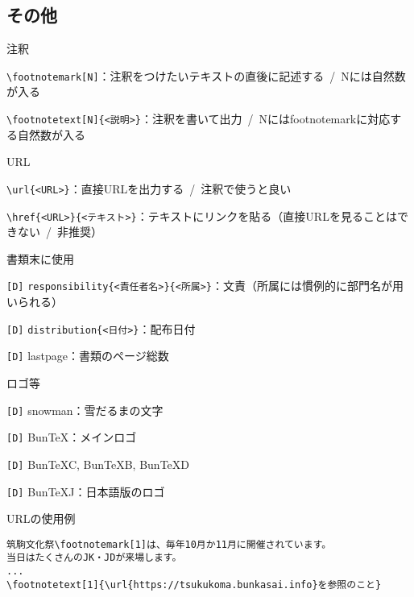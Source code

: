 \begin{multicols*}{2}
\section{その他}
\begin{framebox-simple}{注釈}
    \begin{reitemize}
        \item \verb|\footnotemark[N]|：注釈をつけたいテキストの直後に記述する~/~Nには自然数が入る
        \item \verb|\footnotetext[N]{<説明>}|：注釈を書いて出力~/~Nにはfootnotemarkに対応する自然数が入る
    \end{reitemize}
\end{framebox-simple}
\begin{framebox-simple}{URL}
    \begin{reitemize}
        \item \verb|\url{<URL>}|：直接URLを出力する~/~注釈で使うと良い
        \item \verb|\href{<URL>}{<テキスト>}|：テキストにリンクを貼る（直接URLを見ることはできない~/~非推奨）
    \end{reitemize}
\end{framebox-simple}
\begin{framebox-simple}{書類末に使用}
    \begin{reitemize}
        \item \verb|[D]| \verb|responsibility{<責任者名>}{<所属>}|：文責（所属には慣例的に部門名が用いられる）
        \item \verb|[D]| \verb|distribution{<日付>}|：配布日付
        \item \verb|[D]| lastpage：書類のページ総数
    \end{reitemize}
\end{framebox-simple}
\begin{framebox-simple}{ロゴ等}
    \begin{reitemize}
        \item \verb|[D]| snowman：雪だるまの文字
        \item \verb|[D]| BunTeX：メインロゴ
        \item \verb|[D]| BunTeXC, BunTeXB, BunTeXD
        \item \verb|[D]| BunTeXJ：日本語版のロゴ
    \end{reitemize}
\end{framebox-simple}
\begin{framebox-ref}{URLの使用例}
\begin{verbatim}
筑駒文化祭\footnotemark[1]は、毎年10月か11月に開催されています。
当日はたくさんのJK・JDが来場します。
...
\footnotetext[1]{\url{https://tsukukoma.bunkasai.info}を参照のこと}
\end{verbatim}
\end{framebox-ref}


\end{multicols*}
